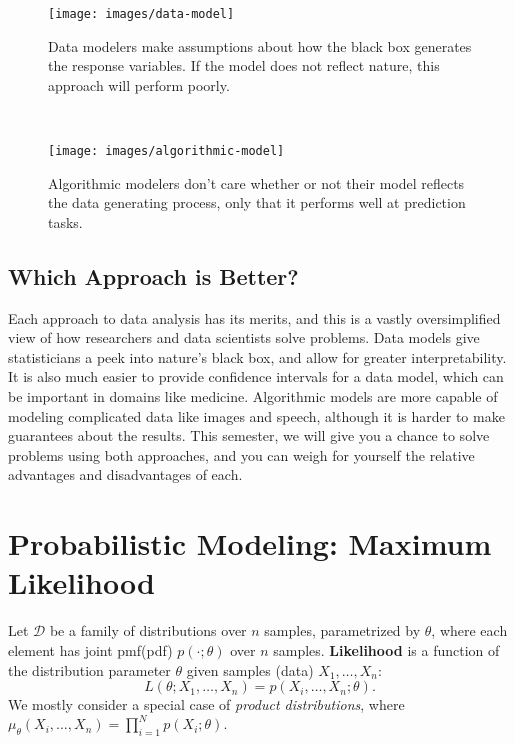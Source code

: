 \documentclass{discussion}
\begin{document}
\begin{figure*}[h!]
    \centering
    \begin{subfigure}[t]{0.5\textwidth}
        \centering
        \texttt{[image: images/data-model]}
        \caption{Data modelers make assumptions about how the black box generates the response variables.  If the model does not reflect nature, this approach will perform poorly.}
    \end{subfigure}%
    ~ 
    \begin{subfigure}[t]{0.5\textwidth}
        \centering
        \texttt{[image: images/algorithmic-model]}
        \caption{Algorithmic modelers don't care whether or not their model reflects the data generating process, only that it performs well at prediction tasks.}
    \end{subfigure}
\end{figure*}

\subsection*{Which Approach is Better?}

Each approach to data analysis has its merits, and this is a vastly oversimplified view of how researchers and data scientists solve problems.  Data models give statisticians a peek into nature's black box, and allow for greater interpretability.  It is also much easier to provide confidence intervals for a data model, which can be important in domains like medicine.  Algorithmic models are more capable of modeling complicated data like images and speech, although it is harder to make guarantees about the results.  This semester, we will give you a chance to solve problems using both approaches, and you can weigh for yourself the relative advantages and disadvantages of each.

\section{Probabilistic Modeling: Maximum Likelihood}

Let $\mathcal{D}$ be a family of distributions over $n$ samples, parametrized by $\theta$, where each element has joint pmf(pdf) $p(\cdot;\theta)$ over $n$ samples. \textbf{Likelihood} is a function of the distribution parameter $\theta$ given samples (data) $X_1, \ldots, X_n$:
\[L(\theta; X_1, \ldots, X_n) = p(X_i, \ldots, X_n; \theta).\]
We mostly consider a special case of \emph{product distributions}, where $\mu_\theta(X_i, \ldots, X_n) = \prod_{i=1}^{N} p(X_i;\theta).$
\end{document}
